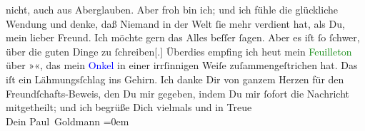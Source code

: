               nicht, auch aus Aberglauben. Aber froh bin ich; und {\pb}ich fühle die glückliche Wendung und denke, daß Niemand in der Welt ſie mehr
               verdient hat, als Du, mein lieber Freund.\pend
           \pstart
           Ich \strikeout{\textcolor{gray}{be}} möchte gern das Alles
               beſſer ſagen. Aber es iſt ſo ſchwer, über die guten Dinge zu
                  ſchreiben{[}.{]} Überdies empfing ich heut mein \textcolor{green}{Feuilleton}{}
               über »\label{K_L02618-111v}\label{K_L02618-111h}«, das mein \textcolor{blue}{Onkel}{} in einer irrſinnigen Weiſe
               zuſammengeſtrichen hat. Das iſt ein Lähmungsſchlag ins Gehirn.\pend
           \pstart
           Ich danke Dir von ganzem Herzen für den Freundſchafts-Beweis, den Du mir
               gegeben, indem Du mir ſofort die {\pb}Nachricht
               mitgetheilt; und ich begrüße Dich vielmals und in Treue {\\[\baselineskip]}Dein \spacefill\mbox{Paul
                  Goldmann}\pend
           \leftskip=0em{}\endnumbering{}\begin{anhang}\end{anhang}
      